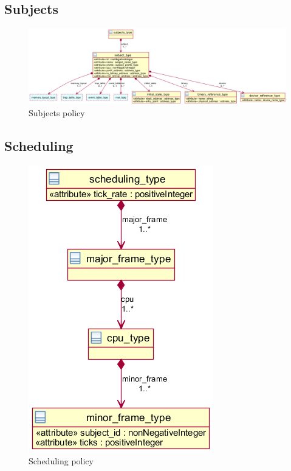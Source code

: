 \subsection{Subjects}
\begin{figure}
	\includegraphics[width=\textwidth]{images/xml_subject.png}
	\caption{Subjects policy}
\end{figure}


\subsection{Scheduling}
\begin{figure}[h]
	\centering
	\includegraphics[scale=0.6]{images/xml_scheduling.png}
	\caption{Scheduling policy}
\end{figure}

